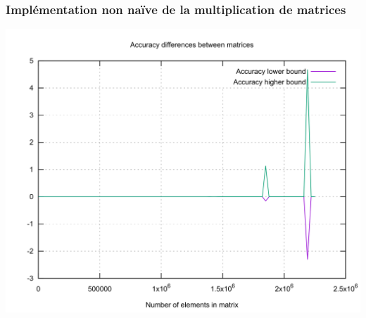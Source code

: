 \begin{frame}
    \frametitle{Implémentation non naïve de la multiplication de matrices}
    \includegraphics[width=\textwidth]{../resources/float_accuracy.png}
\end{frame}
